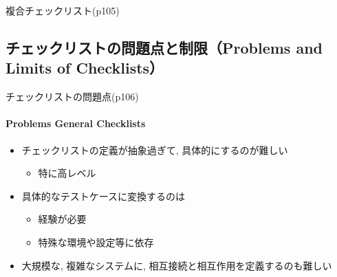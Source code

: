 \begin{frame}[shrink=5]{複合チェックリスト(p105)}
\end{frame}

\subsection{チェックリストの問題点と制限（Problems and Limits of Checklists）}
\begin{frame}{チェックリストの問題点(p106)}
\framesubtitle{Problems General Checklists}

\begin{itemize}
\item チェックリストの定義が抽象過ぎて, 具体的にするのが難しい
    \begin{itemize}
    \item 特に高レベル
    \end{itemize}
\item 具体的なテストケースに変換するのは
    \begin{itemize}
    \item 経験が必要
    \item 特殊な環境や設定等に依存
    \end{itemize}
\item 大規模な, 複雑なシステムに, 相互接続と相互作用を定義するのも難しい 
\end{itemize}

\end{frame}

